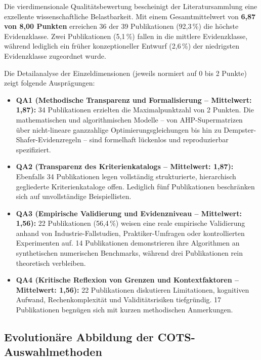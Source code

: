 Die vierdimensionale Qualitätsbewertung bescheinigt der Literatursammlung eine exzellente wissenschaftliche Belastbarkeit. Mit einem Gesamtmittelwert von \textbf{6,87 von 8,00 Punkten} erreichen 36 der 39 Publikationen (92,3\,\%) die höchste Evidenzklasse. Zwei Publikationen (5,1\,\%) fallen in die mittlere Evidenzklasse, während lediglich ein früher konzeptioneller Entwurf (2,6\,\%) der niedrigsten Evidenzklasse zugeordnet wurde.

Die Detailanalyse der Einzeldimensionen (jeweils normiert auf 0 bis 2 Punkte) zeigt folgende Ausprägungen:
\begin{itemize}[leftmargin=*]
  \item \textbf{QA1 (Methodische Transparenz und Formalisierung -- Mittelwert: 1,87):} 34 Publikationen erzielten die Maximalpunktzahl von 2 Punkten. Die mathematischen und algorithmischen Modelle -- von AHP-Supermatrizen über nicht-lineare ganzzahlige Optimierungsgleichungen bis hin zu Dempster-Shafer-Evidenzregeln -- sind formelhaft lückenlos und reproduzierbar spezifiziert.
  \item \textbf{QA2 (Transparenz des Kriterienkatalogs -- Mittelwert: 1,87):} Ebenfalls 34 Publikationen legen vollständig strukturierte, hierarchisch gegliederte Kriterienkataloge offen. Lediglich fünf Publikationen beschränken sich auf unvollständige Beispiellisten.
  \item \textbf{QA3 (Empirische Validierung und Evidenzniveau -- Mittelwert: 1,56):} 22 Publikationen (56,4\,\%) weisen eine reale empirische Validierung anhand von Industrie-Fallstudien, Praktiker-Umfragen oder kontrollierten Experimenten auf. 14 Publikationen demonstrieren ihre Algorithmen an synthetischen numerischen Benchmarks, während drei Publikationen rein theoretisch verbleiben.
  \item \textbf{QA4 (Kritische Reflexion von Grenzen und Kontextfaktoren -- Mittelwert: 1,56):} 22 Publikationen diskutieren Limitationen, kognitiven Aufwand, Rechenkomplexität und Validitätsrisiken tiefgründig. 17 Publikationen begnügen sich mit kurzen methodischen Anmerkungen.
\end{itemize}

\subsection{Evolutionäre Abbildung der COTS-Auswahlmethoden}
\label{subsec:evolutionaere_abbildung}


